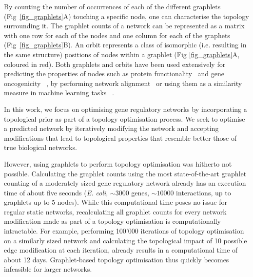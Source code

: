 By counting the number of occurrences of each of the different graphlets (Fig~\ref{fig_graphlets}A) touching a specific node, one can characterise the topology surrounding it. The graphlet counts of a network can be represented as a matrix with one row for each of the nodes and one column for each of the graphets (Fig~\ref{fig_graphlets}B). 
An orbit represents a class of isomorphic (i.e. resulting in the same structure) positions of nodes within a graphlet (Fig \ref{fig_graphlets}A, coloured in red).
Both graphlets and orbits have been used extensively for predicting the properties of nodes such as protein functionality~ \cite{milenkovic_uncoveringbiologicalnetwork_2008,guerrero_characterizationproteasomeinteraction_2008,singh_graphletsignaturebasedscoring_2014} and gene oncogenicity~ \cite{milenkovic_optimalnetworkalignment_2010}, by performing network alignment~ \cite{kuchaiev_topologicalnetworkalignment_2010,milenkovic_globalnetworkalignment_2013} or using them as a similarity measure in machine learning tasks~ \cite{shervashidze_efficientgraphletkernels_2009,vacic_graphletkernelsprediction_2010}. 


In this work, we focus on optimising gene regulatory networks by incorporating a topological prior as part of a topology optimisation process. We seek to optimise a predicted network by iteratively modifying the network and accepting modifications that lead to topological properties that resemble better those of true biological networks.

However, using graphlets to perform topology optimisation was hitherto not possible. Calculating the graphlet counts using the most state-of-the-art graphlet counting of a moderately sized gene regulatory network already has an execution time of about five seconds (\textit{E. coli}, $\sim 3000$ genes, $\sim 10000$ interactions, up to graphlets up to 5 nodes).
While this computational time poses no issue for regular static networks, recalculating all graphlet counts for every network modification made as part of a topology optimisation is computationally intractable. For example, performing 100'000 iterations of topology optimisation on a similarly sized network and calculating the topological impact of 10 possible edge modification at each iteration, already results in a computational time of about 12 days. Graphlet-based topology optimisation thus quickly becomes infeasible for larger networks.

